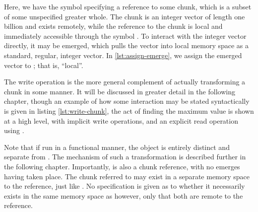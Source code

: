 
Here, we have the symbol  specifying a reference to some chunk, which is a subset of some unspecified greater whole.
The chunk is an integer vector of length one billion and exists remotely, while the reference to the chunk is local and immediately accessible through the symbol .
To interact with the integer vector directly, it may be emerged, which pulls the vector into local memory space as a standard, regular, integer vector.
In \cref{lst:assign-emerge}, we assign the emerged vector to ; that is, ``local''.


The write operation is the more general complement of actually transforming a chunk in some manner.
It will be discussed in greater detail in the following chapter, though an example of how some interaction may be stated syntactically is given in listing \cref{lst:write-chunk}, the act of finding the maximum value is shown at a high level, with implicit write operations, and an explicit read operation using .


Note that if run in a functional manner, the object  is entirely distinct and separate from .
The mechanism of such a transformation is described further in the following chapter.
Importantly,  is also a chunk reference, with no emerges having taken place.
The chunk referred to may exist in a separate memory space to the reference, just like .
No specification is given as to whether it necessarily exists in the same memory space as  however, only that both are remote to the reference.

